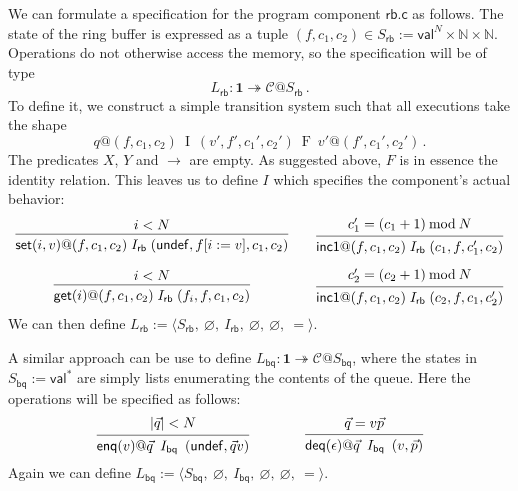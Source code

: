\documentclass[acmsmall,screen,review,anonymous]{acmart}
\newcommand{\kw}[1]{\ensuremath{ \mathsf{#1} }}
\begin{document}
\begin{example} \label{ex:rbspec} %
We can formulate a specification for
the program component $\kw{rb.c}$ as follows.
The state of the ring buffer
is expressed as a tuple
$(f, c_1, c_2) \in S_\kw{rb} := \kw{val}^N \times \mathbb{N} \times \mathbb{N}$.
Operations do not otherwise access the memory,
so the specification will be of type
\[
  L_\kw{rb} : \mathbf{1} \twoheadrightarrow \mathcal{C}@S_\kw{rb}
  \,.
\]
To define it, we construct a simple transition system such that
all executions take the shape
\[
  q@(f, c_1, c_2) \:\mathrel{I}\: (v', f', c_1', c_2')
                  \:\mathrel{F}\: v'@(f', c_1', c_2')
  \,.
\]
The predicates $X$, $Y$ and $\rightarrow$ are empty.
As suggested above, $F$ is in essence the identity relation.
This leaves us to define $I$ which specifies the component's
actual behavior:
\[ \begin{array}{c@{\qquad}c}
 {\begin{prooftree}
    \hypo{i < N}
    \infer1{
      \kw{set}(i, v)@(f, c_1, c_2)
      \mathrel{I_\kw{rb}}
      (\kw{undef}, f[i := v], c_1, c_2)}
  \end{prooftree}}
  &
 {\begin{prooftree}
    \hypo{c_1' = (c_1 + 1) \mathbin{\mathrm{mod}} N}
    \infer1{
      \kw{inc1}@(f, c_1, c_2)
      \mathrel{I_\kw{rb}}
      (c_1, f, c_1', c_2)}
  \end{prooftree}}
  \vspace{1em}
  \\
 {\begin{prooftree}
    \hypo{i < N}
    \infer1{
      \kw{get}(i)@(f, c_1, c_2)
      \mathrel{I_\kw{rb}}
      (f_i, f, c_1, c_2)
    }
  \end{prooftree}}
  &
 {\begin{prooftree}
    \hypo{c_2' = (c_2 + 1) \mathbin{\mathrm{mod}} N}
    \infer1{
      \kw{inc1}@(f, c_1, c_2)
      \mathrel{I_\kw{rb}}
      (c_2, f, c_1, c_2')}
  \end{prooftree}}
\end{array} \]
We can then define
$L_\kw{rb} := \langle
  S_\kw{rb},\:
  \varnothing,\:
  I_\kw{rb},\:
  \varnothing,\:
  \varnothing,\:
  {=}
 \rangle$.

A similar approach can be use to define
$L_\kw{bq} : \mathbf{1} \twoheadrightarrow \mathcal{C}@S_\kw{bq}$,
where the states in $S_\kw{bq} := \kw{val}^*$
are simply lists enumerating the contents of the queue.
Here the operations will be specified as follows:
\[
  \begin{prooftree}
    \hypo{|\vec{q}| < N}
    \infer1{\kw{enq}(v)@\vec{q} \:\mathrel{I_\kw{bq}}\: (\kw{undef}, \vec{q}v)}
  \end{prooftree}
  \qquad\qquad
  \begin{prooftree}
    \hypo{\vec{q} = v\vec{p}}
    \infer1{\kw{deq}(\epsilon)@\vec{q} \:\mathrel{I_\kw{bq}}\: (v, \vec{p})}
  \end{prooftree}
\]
Again we can define $L_\kw{bq} := \langle
  S_\kw{bq},\:
  \varnothing,\:
  I_\kw{bq},\:
  \varnothing,\:
  \varnothing,\:
  {=}
\rangle$.
\end{example}
\end{document}
